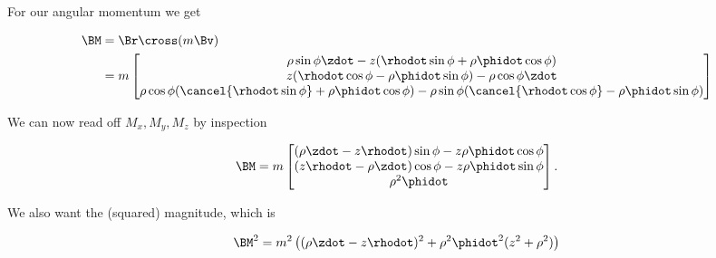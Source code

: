For our angular momentum we get

\begin{align*}
\BM
&= \Br \cross (m \Bv) \\
&=
m
\begin{bmatrix}
\rho\sin\phi \zdot - z (\rhodot \sin\phi + \rho \phidot \cos\phi) \\
z (\rhodot \cos\phi - \rho \phidot \sin\phi) - \rho \cos\phi \zdot \\
\rho \cos\phi (\cancel{\rhodot \sin\phi} + \rho \phidot \cos\phi) - \rho\sin\phi (\cancel{\rhodot \cos\phi} - \rho \phidot \sin\phi)
\end{bmatrix} \\
\end{align*}

We can now read off $M_x, M_y, M_z$ by inspection

\begin{equation}\label{eqn:classicalMechanicsPs2:150}
\BM =
m
\begin{bmatrix}
(\rho \zdot 
- z \rhodot )\sin\phi
- z \rho \phidot \cos\phi
\\
( z \rhodot 
- \rho \zdot ) \cos\phi
- z \rho \phidot \sin\phi
\\
\rho^2 \phidot
\end{bmatrix}.
\end{equation}

We also want the (squared) magnitude, which is

\begin{equation}\label{eqn:classicalMechanicsPs2:170}
\BM^2
=
m^2 \left(
(\rho \zdot - z \rhodot )^2 
+ \rho^2 \phidot^2 ( z^2 + \rho^2 )
\right)
\end{equation}

\EndNoBibArticle
